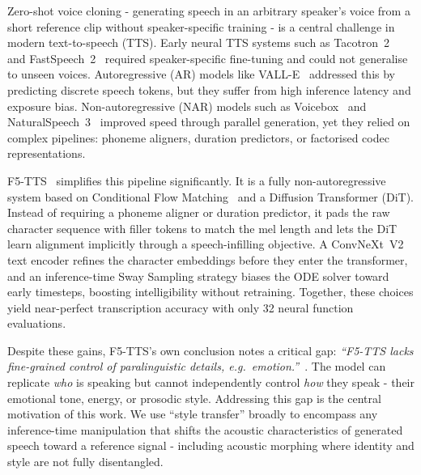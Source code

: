 \documentclass[11pt,a4paper,twocolumn]{article}
\begin{document}
Zero-shot voice cloning - generating speech in an arbitrary speaker's voice
from a short reference clip without speaker-specific training - is a central
challenge in modern text-to-speech (TTS).
Early neural TTS systems such as Tacotron~2~\cite{shen2018tacotron2} and FastSpeech~2~\cite{ren2021fastspeech2} required
speaker-specific fine-tuning and could not generalise to unseen voices.
Autoregressive (AR) models like VALL-E~\cite{wang2023neural} addressed this
by predicting discrete speech tokens, but they suffer from high inference
latency and exposure bias.
Non-autoregressive (NAR) models such as Voicebox~\cite{le2024voicebox} and
NaturalSpeech~3~\cite{ju2024naturalspeech3} improved speed through parallel
generation, yet they relied on complex pipelines: phoneme aligners, duration
predictors, or factorised codec representations.

F5-TTS~\cite{chen2025f5tts} simplifies this pipeline significantly.
It is a fully non-autoregressive system based on Conditional Flow
Matching~\cite{lipman2023flow} and a Diffusion Transformer (DiT).
Instead of requiring a phoneme aligner or duration predictor, it pads the
raw character sequence with filler tokens to match the mel length and lets
the DiT learn alignment implicitly through a speech-infilling objective.
A ConvNeXt~V2 text encoder refines the character embeddings before they
enter the transformer, and an inference-time Sway Sampling strategy biases
the ODE solver toward early timesteps, boosting intelligibility without
retraining.  Together, these choices yield near-perfect transcription
accuracy with only 32 neural function evaluations.

Despite these gains, F5-TTS's own conclusion notes a critical gap:
\emph{``F5-TTS lacks fine-grained control of paralinguistic details,
e.g.\ emotion.''}~\cite{chen2025f5tts}.
The model can replicate \emph{who} is speaking but cannot independently
control \emph{how} they speak - their emotional tone, energy, or prosodic style.
Addressing this gap is the central motivation of this work.
We use ``style transfer'' broadly to encompass any inference-time
manipulation that shifts the acoustic characteristics of generated speech
toward a reference signal - including acoustic morphing where identity and
style are not fully disentangled.
\end{document}
